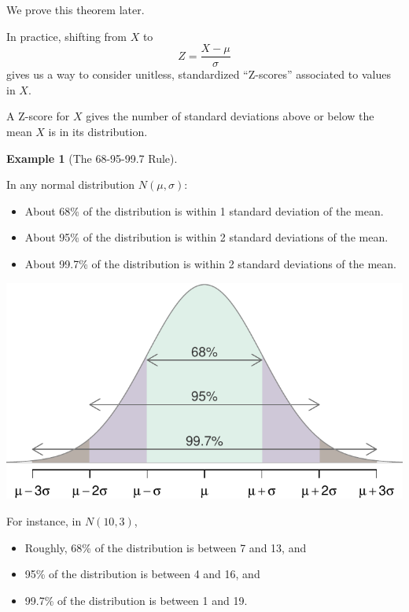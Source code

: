 \documentclass[
]{book}
\providecommand{\tightlist}{%
  \setlength{\itemsep}{0pt}\setlength{\parskip}{0pt}}
\theoremstyle{definition}
\theoremstyle{definition}
\newtheorem{example}{Example}[chapter]
\theoremstyle{definition}
\theoremstyle{definition}
\theoremstyle{remark}
\begin{document}
We prove this theorem later.

In practice, shifting from \(X\) to \[Z = \frac{X-\mu}{\sigma}\] gives us a way to consider unitless, standardized ``Z-scores'' associated to values in \(X\).

A Z-score for \(X\) gives the number of standard deviations above or below the mean \(X\) is in its distribution.

\begin{example}[The 68-95-99.7 Rule]
\protect\hypertarget{exm:normal-rule-of-thumb}{}\label{exm:normal-rule-of-thumb}

In any normal distribution \(N(\mu, \sigma)\):

\begin{itemize}
\tightlist
\item
  About 68\% of the distribution is within 1 standard deviation of the mean.
\item
  About 95\% of the distribution is within 2 standard deviations of the mean.
\item
  About 99.7\% of the distribution is within 2 standard deviations of the mean.
\end{itemize}

\includegraphics{math340-notes_files/figure-latex/unnamed-chunk-18-1.pdf}

For instance, in \(N(10,3)\),

\begin{itemize}
\tightlist
\item
  Roughly, 68\% of the distribution is between 7 and 13, and
\item
  95\% of the distribution is between 4 and 16, and
\item
  99.7\% of the distribution is between 1 and 19.
\end{itemize}

\end{example}
\end{document}
